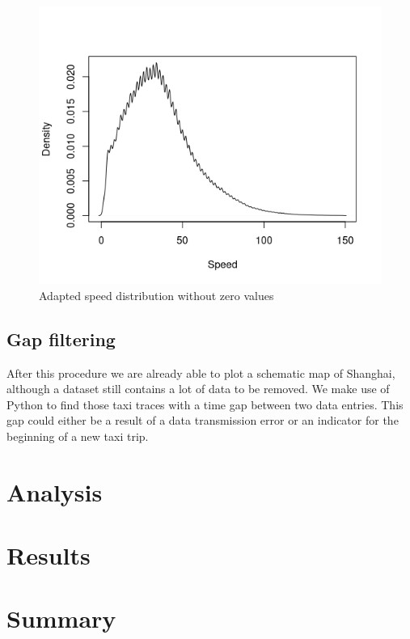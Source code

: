 \documentclass[11pt,conference,a4paper,onecolumn,romanappendices]{IEEEtran}
\begin{document}
\begin{figure}
\includegraphics[scale=0.67]{speed.png}
\caption{\label{fig:speed}Adapted speed distribution without zero values}
\end{figure}
\subsection{Gap filtering}
After this procedure we are already able to plot a schematic map of Shanghai, although a dataset still contains a lot of data to be removed. We make use of Python to find those taxi traces with a time gap between two data entries. This gap could either be a result of a data transmission error or an indicator for the beginning of a new taxi trip.
\section{Analysis}
\section{Results}
\section{Summary}

\newpage


\end{document}
